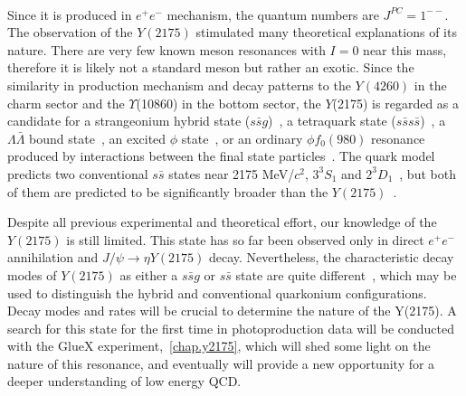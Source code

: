 ~\par Since it is produced in $e^+e^-$ mechanism, the quantum numbers are $J^{PC} = 1^{--}$. The observation of the $Y(2175)$ stimulated many theoretical explanations of its nature. There are very few known meson resonances with $I = 0$ near this mass, therefore it is likely not a standard meson but rather an exotic. Since the similarity in production mechanism and decay patterns to the $Y(4260)$ in the charm sector and the $\Upsilon$(10860) in the bottom sector, the $Y$(2175) is regarded as a candidate for a strangeonium hybrid state ($s\bar{s}g$)~\cite{Gui07}, a tetraquark state ($s\bar{s}s\bar{s}$)~\cite{Chen08}, a $\Lambda \bar{\Lambda}$ bound state~\cite{Klempt07}, an excited $\phi$ state~\cite{Coito09}, or an ordinary $\phi f_0(980)$ resonance produced by interactions between the final state particles~\cite{Alvarez09}. The quark model predicts two conventional $s\bar{s}$ states near 2175 MeV/$c^2$, ${3}^{3}\!S_{1}$ and ${2}^{3}\!D_{1}$~\cite{Godfrey85, Barnes97}, but both of them are predicted to be significantly broader than the $Y(2175)$~\cite{Barnes03, Ding07}.
~\par Despite all previous experimental and theoretical effort, our knowledge of the $Y(2175)$ is still limited. This state has so far been observed only in direct $e^{+}e^{-}$ annihilation and $J/\psi \rightarrow \eta Y(2175)$ decay. Nevertheless, the characteristic decay modes of $Y(2175)$ as either a $s\bar{s}g$ or $s\bar{s}$ state are quite different~\cite{Gui07, Isgur85}, which may be used to distinguish the hybrid and conventional quarkonium configurations. Decay modes and rates will be crucial to determine the nature of the Y(2175). A search for this state for the first time in photoproduction data will be conducted with the GlueX experiment,~\ref{chap.y2175}, which will shed some light on the nature of this resonance, and eventually will provide a new opportunity for a deeper understanding of low energy QCD.

